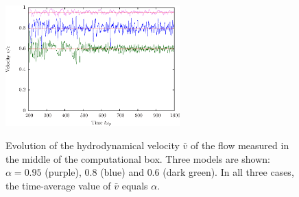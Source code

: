 \begin{figure}[h]
\begin{center}
\includegraphics[width=0.6\textwidth]{pics/chap2/f4.eps}\\
    \caption{Evolution of the hydrodynamical velocity $\bar{v}$ of the flow measured in the middle of the computational box. Three models are shown:
 $\alpha = 0.95$ (purple), $0.8$ (blue) and $0.6$ (dark green). In all three cases, the time-average value of $\bar{v}$ equals $\alpha$.
}
    \label{fig:meanvelocity}
    \end{center}
\end{figure}

